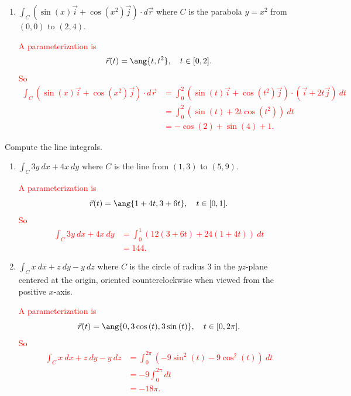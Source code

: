 \documentclass[12pt,reqno]{amsart}
\begin{document}
\begin{enumerate}
\item $\displaystyle\int_C (\sin{(x)} \vec{i} + \cos{(x^2)} \vec{j}) \cdot d\vec{r}$ where $C$ is the parabola $y=x^2$ from $(0,0)$ to $(2,4)$.

\bigskip
\textcolor{red}{A parameterization is
	\[\vec{r}(t) = \ang{ t,t^2} , \quad t\in [ 0,2].
	\]
So
\begin{align*}
\int_C (\sin{(x)} \vec{i} + \cos{(x^2)} \vec{j}) \cdot d\vec{r} &= \int_0^2 ( \sin{(t)} \vec{i} + \cos{(t^2)} \vec{j} ) \cdot ( \vec{i} +2t \vec{j} ) \ dt \\
&= \int_0^2 (\sin{(t)} + 2t \cos{(t^2)} ) \ dt \\
&= -\cos{(2)} + \sin{(4)} + 1.
\end{align*}}

\end{enumerate}

\bigskip
\prob Compute the line integrals.

\bigskip
\begin{enumerate}
\item $\displaystyle\int_C 3y \ dx + 4x \ dy$ where $C$ is the line from $(1,3)$ to $(5,9)$.

\bigskip
\textcolor{red}{A parameterization is
	\[\vec{r}(t) = \ang{1+4t,3+ 6t}, \quad t\in [0,1].
	\]
So
\begin{align*}
\int_C 3y \ dx + 4x \ dy &= \int_0^1 ( 12(3+6t) + 24(1+4t) ) \ dt \\
&= 144.
\end{align*}}
\bigskip

\item $\displaystyle\int_C x \ dx + z \ dy - y \ dz$ where $C$ is the circle of radius $3$ in the $yz$-plane centered at the origin, oriented counterclockwise when viewed from the positive $x$-axis.

\bigskip
\textcolor{red}{A parameterization is
	\[\vec{r}(t) = \ang{0,3\cos{(t)},3\sin{(t)}}, \quad t\in [0,2\pi].
	\]
So
\begin{align*}
\int_C x \ dx + z \ dy - y \ dz &= \int_0^{2\pi} ( -9\sin^2{(t)} -9\cos^2{(t)}  ) \ dt \\
&= -9 \int_0^{2\pi} dt \\
&= -18\pi.
\end{align*}}

\end{enumerate}
\end{document}
